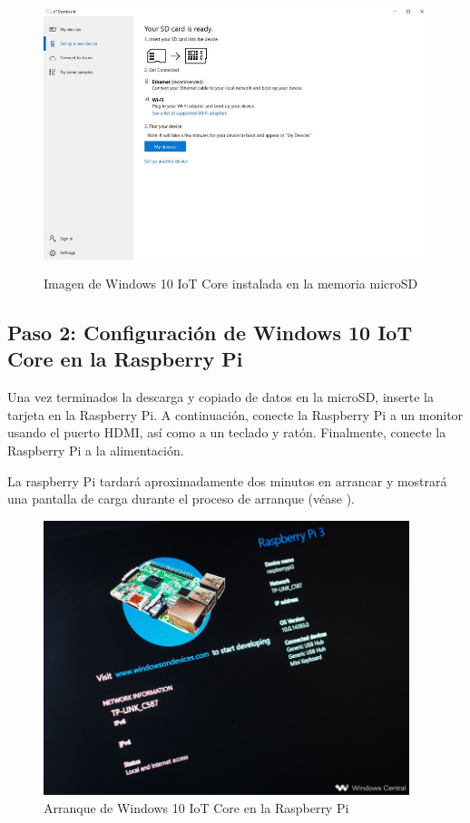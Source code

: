 \documentclass[letterpaper,10.5pt]{article}
\begin{document}
\begin{figure}
	\centering%
	\includegraphics[width=0.9\columnwidth,height=8cm,keepaspectratio]{img/p02-03.jpg} %
	\caption{Imagen de Windows 10 IoT Core instalada en la memoria microSD}
	\label{fig:image-installed} %
\end{figure}

%
%
\subsection{Paso 2: Configuración de Windows 10 IoT Core en la Raspberry Pi}%
\label{sec:step2}

Una vez terminados la descarga y copiado de datos en la microSD, inserte la tarjeta en la Raspberry Pi.
A continuación, conecte la Raspberry Pi a un monitor usando el puerto HDMI, así como a un teclado y ratón.
Finalmente, conecte la Raspberry Pi a la alimentación.

La raspberry Pi tardará aproximadamente dos minutos en arrancar y mostrará una pantalla de carga durante el proceso de arranque (véase ).

\begin{figure}[H]
	\centering%
	\includegraphics[width=0.9\columnwidth,height=8cm,keepaspectratio]{img/p02-04.jpg} %
	\caption{Arranque de Windows 10 IoT Core en la Raspberry Pi}
	\label{fig:boot} %
\end{figure}
\end{document}
